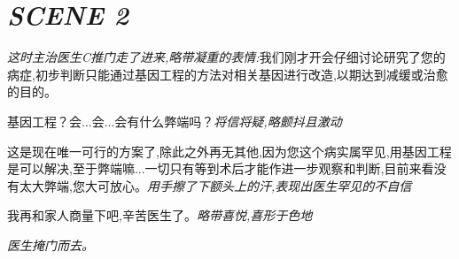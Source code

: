 \documentclass[11pt,a4paper,oneside]{memoir}  %
\begin{document}
  \section*{\textit{SCENE 2}}
  \begin{description}[itemsep=1ex,leftmargin=1cm]
    
    \item[] \hfill
    
    \item[医生C] \textit{这时主治医生\textup{C}推门走了进来,略带凝重的表情:}我们刚才开会仔细讨论研究了您的病症,初步判断只能通过基因工程的方法对相关基因进行改造,以期达到减缓或治愈的目的。    
    \item[病人A] 基因工程？会...会...会有什么弊端吗？\textit{将信将疑,略颤抖且激动}
    \item[医生C] 这是现在唯一可行的方案了,除此之外再无其他,因为您这个病实属罕见,用基因工程是可以解决,至于弊端嘛...一切只有等到术后才能作进一步观察和判断,目前来看没有太大弊端,您大可放心。\textit{用手擦了下额头上的汗,表现出医生罕见的不自信}
    \item[病人A] 我再和家人商量下吧,辛苦医生了。\textit{略带喜悦,喜形于色地}
        
    \textit{医生掩门而去。} 
\end{description}
\vskip 1cm
\end{document}
